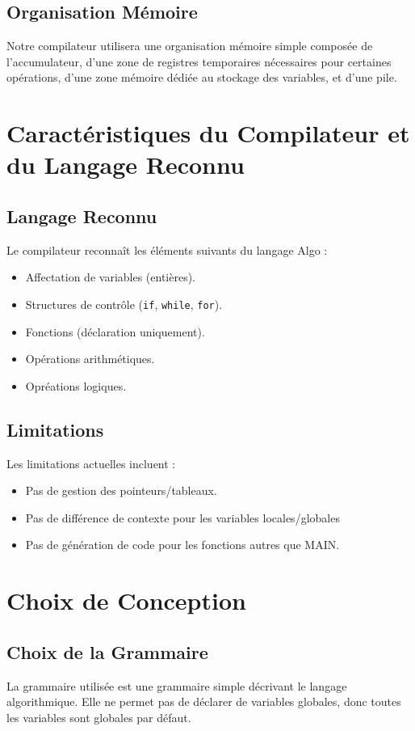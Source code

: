 \documentclass[a4paper,12pt]{article}
\begin{document}
\subsection{Organisation Mémoire}
Notre compilateur utilisera une organisation mémoire simple composée de l'accumulateur, d'une zone de registres temporaires nécessaires pour certaines opérations, d'une zone mémoire dédiée au stockage des variables, et d'une pile.

\section{Caractéristiques du Compilateur et du Langage Reconnu}

\subsection{Langage Reconnu}
Le compilateur reconnaît les éléments suivants du langage Algo :
\begin{itemize}
    \item Affectation de variables (entières).
    \item Structures de contrôle (\texttt{if}, \texttt{while}, \texttt{for}).
    \item Fonctions (déclaration uniquement).
    \item Opérations arithmétiques.
    \item Opréations logiques.
\end{itemize}

\subsection{Limitations}
Les limitations actuelles incluent :
\begin{itemize}
    \item Pas de gestion des pointeurs/tableaux.
    \item Pas de différence de contexte pour les variables locales/globales
    \item Pas de génération de code pour les fonctions autres que MAIN.
\end{itemize}

\section{Choix de Conception}

\subsection{Choix de la Grammaire}
La grammaire utilisée est une grammaire simple décrivant le langage algorithmique. Elle ne permet pas de déclarer de variables globales, donc toutes les variables sont globales par défaut.
\end{document}
